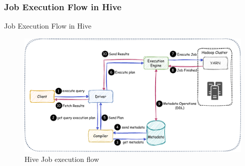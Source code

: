 \subsubsection{Job Execution Flow in Hive}
\begin{frame}{Job Execution Flow in Hive}

\begin{figure}
	\includegraphics[width=\textwidth,height=\textheight,keepaspectratio]{./Figures/chapter-03/Hive_Query_Flow.pdf}
	\caption{Hive Job execution flow}
\end{figure}


	\end{frame}


